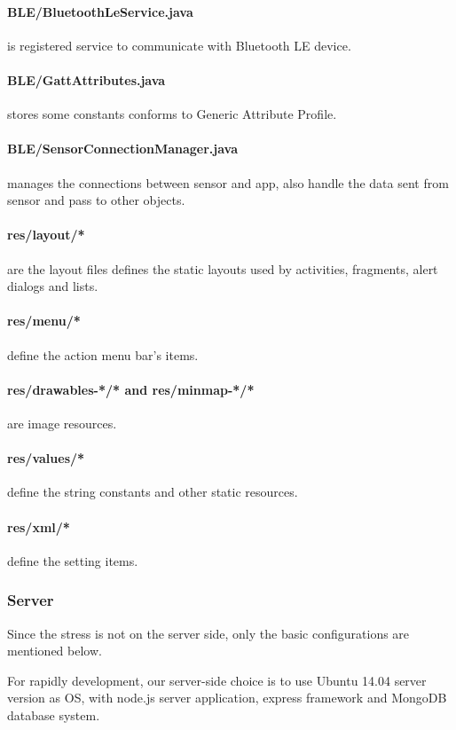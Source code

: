 \documentclass[10pt,a4paper,final]{scrartcl}
\begin{document}
\paragraph{BLE/BluetoothLeService.java} is registered service to communicate with Bluetooth LE device.
\paragraph{BLE/GattAttributes.java} stores some constants conforms to Generic Attribute Profile.
\paragraph{BLE/SensorConnectionManager.java} manages the connections between sensor and app, also handle the data sent from sensor and pass to other objects.


\paragraph{res/layout/*} are the layout files defines the static layouts used by activities, fragments, alert dialogs and lists.
\paragraph{res/menu/*} define the action menu bar's items.
\paragraph{res/drawables-*/* and res/minmap-*/*} are image resources.
\paragraph{res/values/*} define the string constants and other static resources.
\paragraph{res/xml/*} define the setting items.





\subsubsection{Server}

Since the stress is not on the server side, only the basic configurations are mentioned below.

For rapidly development, our server-side choice is to use Ubuntu 14.04 server version as OS, with node.js server application, express framework and MongoDB database system. 
\end{document}
